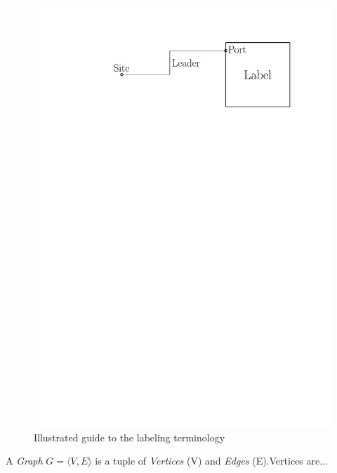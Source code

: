 \documentclass[11pt,a4paper]{vutinfth}
\begin{document}
\begin{figure}%
 \captionsetup{justification=centering, margin=0.75cm}
 \centering
  \includegraphics[scale=0.5]{IPE_TerminologyDrawing.pdf}
  \caption{Illustrated guide to the labeling terminology}
 \label{fig:term}
\end{figure}

A \emph{Graph} $G=\langle V, E \rangle$ is a tuple of \emph{Vertices} (V) and \emph{Edges} (E).Vertices are... %
\end{document}
